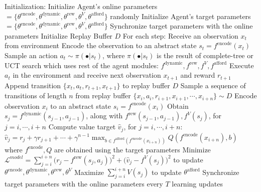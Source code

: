 \documentclass[nohyperref]{article}
\theoremstyle{plain}
\theoremstyle{definition}
\theoremstyle{remark}
\newcommand{\grasp}{{G}r{ASP} }
\newcommand{\afford}{\mathrm{afford}}
\newcommand{\fafford}{f^{\afford}}
\newcommand{\thetaafford}{\theta^{\afford}}
\newcommand{\encode}{\mathrm{encode}}
\newcommand{\thetaencode}{\theta^{\encode}}
\newcommand{\fencode}{f^{\encode}}
\newcommand{\dynamic}{\mathrm{dynamic}}
\newcommand{\fdynamic}{f^{\dynamic}}
\newcommand{\thetadynamic}{\theta^{\dynamic}}
\newcommand{\reward}{\mathrm{rew}}
\newcommand{\freward}{f^{\reward}}
\newcommand{\thetareward}{\theta^{\reward}}
\newcommand{\val}{V}
\newcommand{\fvalue}{f^{\val}}
\newcommand{\thetavalue}{\theta^{\val}}
\begin{document}
\begin{algorithm}[h!]
\caption{Learning Affordance Selections for Planning using \grasp}
\label{alg:grasp_algorithm}
\begin{algorithmic}
    \STATE Initialization:
        \STATE \qquad Initialize Agent's online parameters  $ =\{ \thetaencode, \thetadynamic, \thetareward, \thetavalue, \thetaafford \} $ randomly
        \STATE \qquad Initialize Agent's target parameters  $=\{ \thetaencode, \thetadynamic, \thetareward, \thetavalue, \thetaafford \}$ 
        \STATE \qquad Synchronize target parameters with the online parameters
        \STATE \qquad Initialize Replay Buffer $D$
    \STATE For each step: 
        \STATE {}
        \STATE \qquad Receive an observation $x_t$ from environment
        \STATE \qquad Encode the observation to an abstract state $s_t = \fencode(x_t)$
        \STATE \qquad Sample an action $ a_t \sim \pi(\bullet | s_t)$,
        \STATE \qquad \qquad where $\pi(\bullet|s_t)$ is the result of complete-tree or UCT search
        \STATE \qquad \qquad which uses rest of the agent modules: $\fdynamic, \freward, \fvalue, \fafford$
        \STATE \qquad Execute $a_t$ in the environment and receive next observation $x_{t+1}$ and reward $r_{t+1}$
        \STATE \qquad Append transition $ \{ x_t, a_t, r_{t+1}, x_{t+1} \}$ to replay buffer $D$
        \STATE {}
        \STATE \qquad Sample a sequence of transitions of length $n$ from replay buffer 
        \STATE \qquad \qquad $ \{ x_i, a_i, r_{i+1}, x_{i+1}, \cdots, x_{i+n} \} \sim D $
        \STATE \qquad Encode observation $ x_i $ to an abstract state $s_i = \fencode(x_i)$
        \STATE \qquad Obtain $s_j = \fdynamic(s_{j-1}, a_{j-1})$, along with $ \freward(s_{j-1}, a_{j-1}), \fvalue(s_j)$,
        \STATE \qquad \qquad for $j = i, \cdots, i+n$
        \STATE \qquad Compute value target $\hat{v}_j$, for $j=i, \cdots, i+n$: 
        \STATE \qquad \qquad $ \hat{v}_j = r_j + \gamma r_{j+1} + \cdots + \gamma^{n-1} \max_{b \in \fafford(\fencode(x_{i+n})) }Q(\fencode(x_{i+n}), b) $
        \STATE \qquad \qquad where $\fencode, Q$ are obtained using the target parameters %
        \STATE {}
        \STATE \qquad Minimize $ \mathcal{L}^{model} = \sum_{j=i}^{i+n} \big( r_{j} - \freward(s_j, a_j) \big)^2 + \big( \hat{v}_j - \fvalue(s_j) \big)^2$ 
        \STATE \qquad \qquad to update $\thetaencode, \thetadynamic, \thetareward, \thetavalue$
        \STATE \qquad Maximize $ \sum_{j=i}^{i+n} V(s_j) $ to update $\thetaafford$
        \STATE \qquad Synchronize target parameters with the online parameters every $T$ learning updates
\end{algorithmic}
\end{algorithm}


\end{document}
